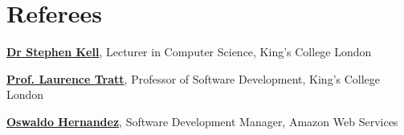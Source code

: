 \documentclass[12pt,a4paper]{article}
\begin{document}

\section{Referees}

\begin{flushleft}
\href{https://www.kcl.ac.uk/people/stephen-kell}{\textbf{Dr Stephen Kell}}, Lecturer in Computer Science, King's College London

\href{https://www.kcl.ac.uk/people/laurence-tratt}{\textbf{Prof. Laurence Tratt}}, Professor of Software Development, King's College London

\href{mailto:oswaldhs@amazon.co.uk}{\textbf{Oswaldo Hernandez}}, Software Development Manager, Amazon Web Services
\end{flushleft}
\end{document}
